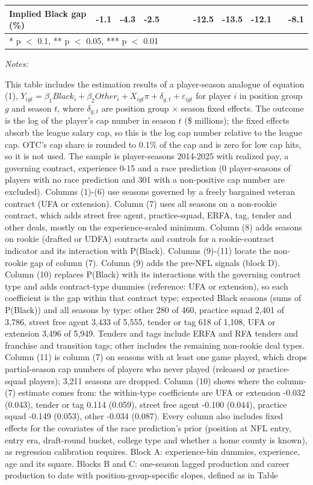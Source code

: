 \begin{table}[!h]
{\begin{threeparttable}
\begin{tabular}[t]{lccccccccccc}
Implied Black gap (\%) & -1.1 & -4.3 & -2.5 &  &  &  & -12.5 & -13.5 & -12.1 &  & -8.1\\
\bottomrule
\multicolumn{12}{l}{\rule{0pt}{1em}* p $<$ 0.1, ** p $<$ 0.05, *** p $<$ 0.01}\\
\end{tabular}
\begin{tablenotes}[para]
\item \textit{Notes:} 
\item This table includes the estimation results of a player-season analogue of equation (1), $Y_{igt} = \beta_1 Black_i + \beta_2 Other_i + X_{igt}\pi + \delta_{g,t} + \varepsilon_{igt}$ for player $i$ in position group $g$ and season $t$, where $\delta_{g,t}$ are position group $\times$ season fixed effects. The outcome is the log of the player's cap number in season $t$ (\$ millions); the fixed effects absorb the league salary cap, so this is the log cap number relative to the league cap. OTC's cap share is rounded to 0.1\% of the cap and is zero for low cap hits, so it is not used. The sample is player-seasons 2014-2025 with realized pay, a governing contract, experience 0-15 and a race prediction (0 player-seasons of players with no race prediction and 301 with a non-positive cap number are excluded). Columns (1)-(6) use seasons governed by a freely bargained veteran contract (UFA or extension). Column (7) uses all seasons on a non-rookie contract, which adds street free agent, practice-squad, ERFA, tag, tender and other deals, mostly on the experience-scaled minimum. Column (8) adds seasons on rookie (drafted or UDFA) contracts and controls for a rookie-contract indicator and its interaction with P(Black). Columns (9)-(11) locate the non-rookie gap of column (7). Column (9) adds the pre-NFL signals (block D). Column (10) replaces P(Black) with its interactions with the governing contract type and adds contract-type dummies (reference: UFA or extension), so each coefficient is the gap within that contract type; expected Black seasons (sums of P(Black)) and all seasons by type: other 280 of 460, practice squad 2,401 of 3,786, street free agent 3,433 of 5,555, tender or tag 618 of 1,108, UFA or extension 3,496 of 5,949. Tenders and tags include ERFA and RFA tenders and franchise and transition tags; other includes the remaining non-rookie deal types. Column (11) is column (7) on seasons with at least one game played, which drops partial-season cap numbers of players who never played (released or practice-squad players); 3,211 seasons are dropped. Column (10) shows where the column-(7) estimate comes from: the within-type coefficients are UFA or extension -0.032 (0.043), tender or tag 0.114 (0.059), street free agent -0.100 (0.044), practice squad -0.149 (0.053), other -0.034 (0.087). Every column also includes fixed effects for the covariates of the race prediction's prior (position at NFL entry, entry era, draft-round bucket, college type and whether a home county is known), as regression calibration requires. Block A: experience-bin dummies, experience, age and its square. Blocks B and C: one-season lagged production and career production to date with position-group-specific slopes, defined as in Table 
\end{tablenotes}
\end{threeparttable}}
\end{table}
